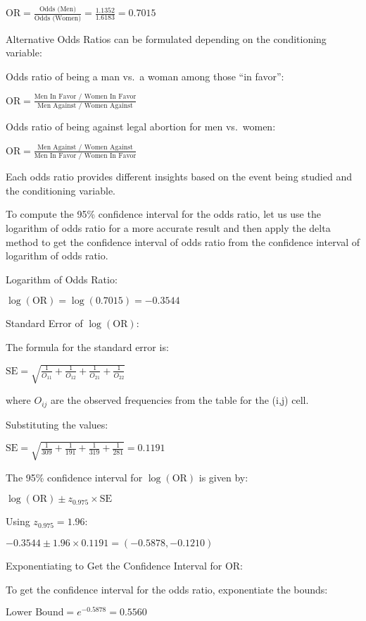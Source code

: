 \documentclass[
]{article}
\begin{document}
\({\text{OR} = \frac{\text{Odds (Men)}}{\text{Odds (Women)}} = \frac{1.1352}{1.6183} = 0.7015}\)

Alternative Odds Ratios can be formulated depending on the conditioning
variable:

Odds ratio of being a man vs.~a woman among those ``in favor'':

\({\text{OR} = \frac{\text{Men In Favor / Women In Favor}}{\text{Men Against / Women Against}}}\)

Odds ratio of being against legal abortion for men vs.~women:

\({\text{OR} = \frac{\text{Men Against / Women Against}}{\text{Men In Favor / Women In Favor}}}\)

Each odds ratio provides different insights based on the event being
studied and the conditioning variable.

To compute the 95\% confidence interval for the odds ratio, let us use
the logarithm of odds ratio for a more accurate result and then apply
the delta method to get the confidence interval of odds ratio from the
confidence interval of logarithm of odds ratio.

Logarithm of Odds Ratio:

\({\log(\text{OR}) = \log(0.7015) = -0.3544}\)

Standard Error of \({\log(\text{OR})}\):

The formula for the standard error is:

\({\text{SE} = \sqrt{\frac{1}{O_{11}} + \frac{1}{O_{12}} + \frac{1}{O_{21}} + \frac{1}{O_{22}}}}\)

where \({O_{ij}}\) are the observed frequencies from the table for the
(i,j) cell.

Substituting the values:

\({\text{SE} = \sqrt{\frac{1}{309} + \frac{1}{191} + \frac{1}{319} + \frac{1}{281}} = 0.1191}\)

The 95\% confidence interval for \({\log(\text{OR})}\) is given by:

\({\log(\text{OR}) \pm z_{0.975} \times \text{SE}}\)

Using \({z_{0.975} = 1.96}\):

\({-0.3544 \pm 1.96 \times 0.1191 = (-0.5878, -0.1210)}\)

Exponentiating to Get the Confidence Interval for OR:

To get the confidence interval for the odds ratio, exponentiate the
bounds:

\({\text{Lower Bound} = e^{-0.5878} = 0.5560}\)
\end{document}
